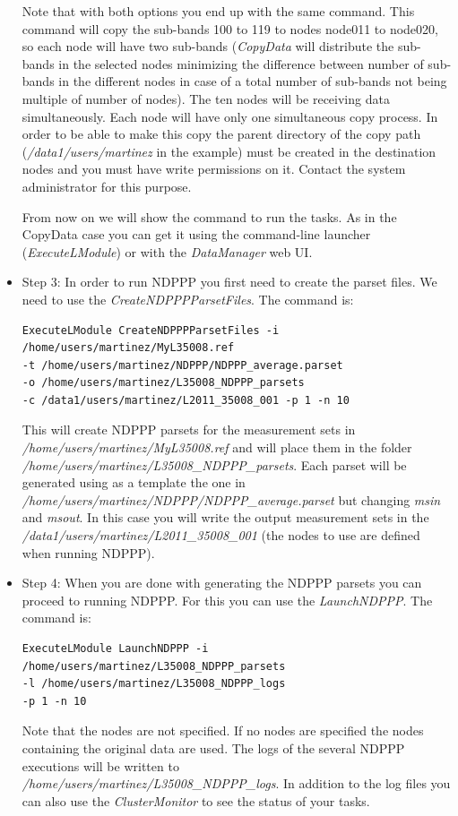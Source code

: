 \documentclass[a4paper,11pt]{article}
\begin{document}
\begin{itemize}
	Note that with both options you end up with the same command. This command will copy the sub-bands 100 to 119 to nodes node011 to node020, so each node will have two sub-bands (\textit{CopyData} will distribute the sub-bands in the selected nodes minimizing the difference between number of sub-bands in the different nodes in case of a total number of sub-bands not being multiple of number of nodes). The ten nodes will be receiving data simultaneously. Each node will have only one simultaneous copy process. In order to be able to make this copy the parent directory of the copy path (\textit{/data1/users/martinez} in the example) must be created in the destination nodes and you must have write permissions on it. Contact the system administrator for this purpose.

	From now on we will show the command to run the tasks. As in the CopyData case you can get it using the command-line launcher (\textit{ExecuteLModule}) or with the \textit{DataManager} web UI.

	\item Step 3: In order to run NDPPP you first need to create the parset files. We need to use the \textit{CreateNDPPPParsetFiles}. The command is:\begin{verbatim}
ExecuteLModule CreateNDPPPParsetFiles -i /home/users/martinez/MyL35008.ref 
-t /home/users/martinez/NDPPP/NDPPP_average.parset
-o /home/users/martinez/L35008_NDPPP_parsets 
-c /data1/users/martinez/L2011_35008_001 -p 1 -n 10
\end{verbatim}

This will create NDPPP parsets for the measurement sets in \\ \textit{/home/users/martinez/MyL35008.ref} and will place them in the folder \\  \textit{/home/users/martinez/L35008\_NDPPP\_parsets}. Each parset will be generated using as a template the one in \textit{/home/users/martinez/NDPPP/NDPPP\_average.parset} but changing \textit{msin} and \textit{msout}. In this case you will write the output measurement sets in the \textit{/data1/users/martinez/L2011\_35008\_001} (the nodes to use are defined when running NDPPP).

	\item Step 4: When you are done with generating the NDPPP parsets you can proceed to running NDPPP. For this you can use the \textit{LaunchNDPPP}. The command is:
\begin{verbatim}
ExecuteLModule LaunchNDPPP -i /home/users/martinez/L35008_NDPPP_parsets 
-l /home/users/martinez/L35008_NDPPP_logs
-p 1 -n 10
\end{verbatim}
Note that the nodes are not specified. If no nodes are specified the nodes containing the original data are used. The logs of the several NDPPP executions will be written to \\ \textit{/home/users/martinez/L35008\_NDPPP\_logs}. In addition to the log files you can also use the \textit{ClusterMonitor} to see the status of your tasks.


\end{itemize}
\end{document}
